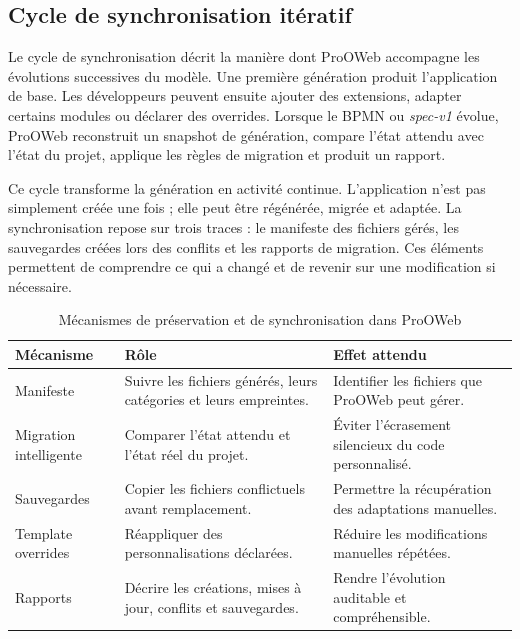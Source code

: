 \subsection{Cycle de synchronisation itératif}

Le cycle de synchronisation décrit la manière dont ProOWeb accompagne les évolutions successives du modèle. Une première génération produit l'application de base. Les développeurs peuvent ensuite ajouter des extensions, adapter certains modules ou déclarer des overrides. Lorsque le BPMN ou \textit{spec-v1} évolue, ProOWeb reconstruit un snapshot de génération, compare l'état attendu avec l'état du projet, applique les règles de migration et produit un rapport.

Ce cycle transforme la génération en activité continue. L'application n'est pas simplement créée une fois ; elle peut être régénérée, migrée et adaptée. La synchronisation repose sur trois traces : le manifeste des fichiers gérés, les sauvegardes créées lors des conflits et les rapports de migration. Ces éléments permettent de comprendre ce qui a changé et de revenir sur une modification si nécessaire.

\begin{table}[H]
\centering
\small
\caption{Mécanismes de préservation et de synchronisation dans ProOWeb}
\label{tab:chap3-preservation-synchronisation}
\begin{tabular}{p{3.8cm}p{5.0cm}p{4.8cm}}
\hline
\textbf{Mécanisme} & \textbf{Rôle} & \textbf{Effet attendu} \\
\hline
Manifeste & Suivre les fichiers générés, leurs catégories et leurs empreintes. & Identifier les fichiers que ProOWeb peut gérer. \\
Migration intelligente & Comparer l'état attendu et l'état réel du projet. & Éviter l'écrasement silencieux du code personnalisé. \\
Sauvegardes & Copier les fichiers conflictuels avant remplacement. & Permettre la récupération des adaptations manuelles. \\
Template overrides & Réappliquer des personnalisations déclarées. & Réduire les modifications manuelles répétées. \\
Rapports & Décrire les créations, mises à jour, conflits et sauvegardes. & Rendre l'évolution auditable et compréhensible. \\
\hline
\end{tabular}
\end{table}


